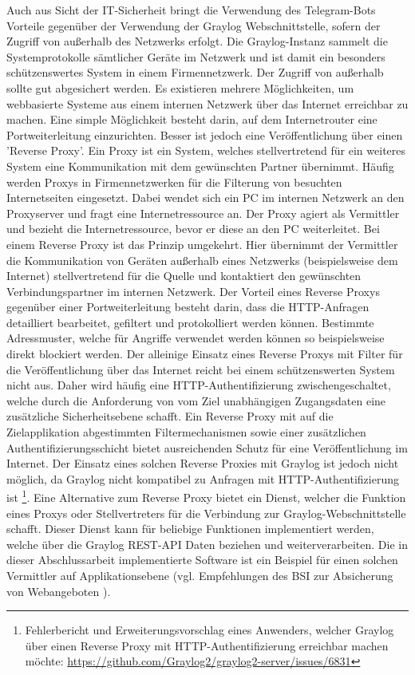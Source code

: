 Auch aus Sicht der IT-Sicherheit bringt die Verwendung des Telegram-Bots Vorteile gegenüber der Verwendung der Graylog Webschnittstelle, sofern der Zugriff von außerhalb des Netzwerks erfolgt. Die Graylog-Instanz sammelt die Systemprotokolle sämtlicher Geräte im Netzwerk und ist damit ein besonders schützenswertes System in einem Firmennetzwerk. Der Zugriff von außerhalb sollte gut abgesichert werden. Es existieren mehrere Möglichkeiten, um webbasierte Systeme aus einem internen Netzwerk über das Internet erreichbar zu machen. Eine simple Möglichkeit besteht darin, auf dem Internetrouter eine Portweiterleitung einzurichten. Besser ist jedoch eine Veröffentlichung über einen 'Reverse Proxy'. Ein Proxy ist ein System, welches stellvertretend für ein weiteres System eine Kommunikation mit dem gewünschten Partner übernimmt. Häufig werden Proxys in Firmennetzwerken für die Filterung von besuchten Internetseiten eingesetzt. Dabei wendet sich ein PC im internen Netzwerk an den Proxyserver und fragt eine Internetressource an. Der Proxy agiert als Vermittler und bezieht die Internetressource, bevor er diese an den PC weiterleitet. Bei einem Reverse Proxy ist das Prinzip umgekehrt. Hier übernimmt der Vermittler die Kommunikation von Geräten außerhalb eines Netzwerks (beispielsweise dem Internet) stellvertretend für die Quelle und kontaktiert den gewünschten Verbindungspartner im internen Netzwerk. Der Vorteil eines Reverse Proxys gegenüber einer Portweiterleitung besteht darin, dass die HTTP-Anfragen detailliert bearbeitet, gefiltert und protokolliert werden können. Bestimmte Adressmuster, welche für Angriffe verwendet werden können so beispielsweise direkt blockiert werden. Der alleinige Einsatz eines Reverse Proxys mit Filter für die Veröffentlichung über das Internet reicht bei einem schützenswerten System nicht aus. Daher wird häufig eine HTTP-Authentifizierung zwischengeschaltet, welche durch die Anforderung von vom Ziel unabhängigen Zugangsdaten eine zusätzliche Sicherheitsebene schafft. Ein Reverse Proxy mit auf die Zielapplikation abgestimmten Filtermechanismen sowie einer zusätzlichen Authentifizierungsschicht bietet ausreichenden Schutz für eine Veröffentlichung im Internet. Der Einsatz eines solchen Reverse Proxies mit Graylog ist jedoch nicht möglich, da Graylog nicht kompatibel zu Anfragen mit HTTP-Authentifizierung ist \footnote{Fehlerbericht und Erweiterungsvorschlag eines Anwenders, welcher Graylog über einen Reverse Proxy mit HTTP-Authentifizierung erreichbar machen möchte: \url{https://github.com/Graylog2/graylog2-server/issues/6831}}. Eine Alternative zum Reverse Proxy bietet ein Dienst, welcher die Funktion eines Proxys oder Stellvertreters für die Verbindung zur Graylog-Webschnittstelle schafft. Dieser Dienst kann für beliebige Funktionen implementiert werden, welche über die Graylog REST-API Daten beziehen und weiterverarbeiten. Die in dieser Abschlussarbeit implementierte Software ist ein Beispiel für einen solchen Vermittler auf Applikationsebene (vgl. Empfehlungen des BSI zur Absicherung von Webangeboten \cite[S. 12 ff.]{bsi-websec}).

